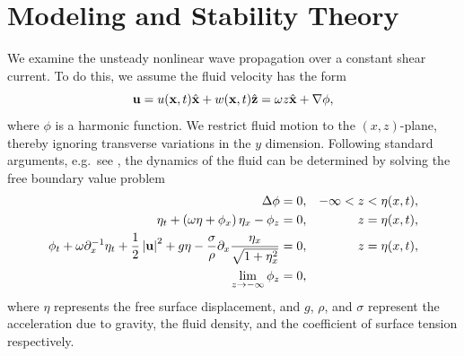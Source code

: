\documentclass[a4paper,11pt]{article}
\newcommand{\pd}{\partial}
\begin{document}
\section*{Modeling and Stability Theory}
We examine the unsteady nonlinear wave propagation over a constant shear current.  To do this, we assume the fluid velocity has the form
\[
{\bf u} = u({\bf x},t)\hat{{\bf x}} + w({\bf x},t)\hat{{\bf z}} = \omega z\hat{{\bf x}} + \nabla \phi,
\]
where $\phi$ is a harmonic function.  We restrict fluid motion to the $(x,z)$-plane, thereby ignoring transverse variations in the $y$ dimension.   Following standard arguments, e.g.~see \cite{ashton}, the dynamics of the fluid can be determined by solving the free boundary value problem
\begin{align}
\Delta \phi = 0, & & -\infty< z < \eta(x,t), \nonumber \\
\eta_{t} +\left(\omega\eta+\phi_{x}\right)\eta_{x} - \phi_{z} = 0, & & z=\eta(x,t), \label{kine}\\
\phi_{t} + \omega\pd_{x}^{-1}\eta_{t} + \frac{1}{2} \left|{\bf
    u}\right|^{2} + g\eta -
\frac{\sigma}{\rho}\pd_{x}\frac{\eta_{x}}{\sqrt{1+\eta_{x}^{2}}}= 0, &
& z=\eta(x,t), \label{bernou}\\
\lim_{z\rightarrow -\infty} \phi_{z} = 0, \nonumber
\end{align}
where $\eta$ represents the free surface displacement, and $g$, $\rho$, and $\sigma$ represent the acceleration due to gravity, the fluid density, and the coefficient of surface tension respectively.
\end{document}

